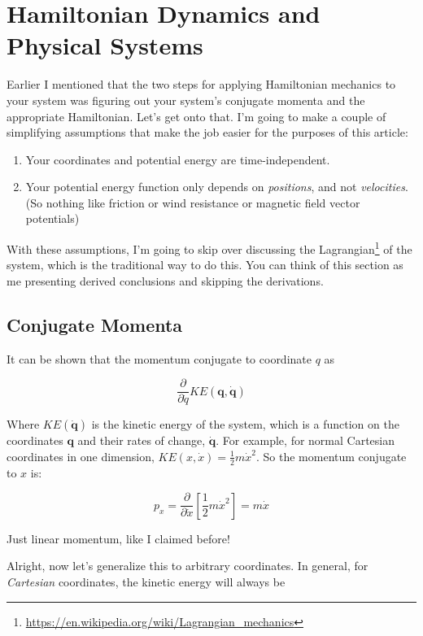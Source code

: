 \documentclass[]{article}
\renewcommand{\href}[2]{#2\footnote{\url{#1}}}
\begin{document}
\section{Hamiltonian Dynamics and Physical
Systems}\label{hamiltonian-dynamics-and-physical-systems}

Earlier I mentioned that the two steps for applying Hamiltonian mechanics to
your system was figuring out your system's conjugate momenta and the appropriate
Hamiltonian. Let's get onto that. I'm going to make a couple of simplifying
assumptions that make the job easier for the purposes of this article:

\begin{enumerate}
\def\labelenumi{\arabic{enumi}.}
\tightlist
\item
  Your coordinates and potential energy are time-independent.
\item
  Your potential energy function only depends on \emph{positions}, and not
  \emph{velocities}. (So nothing like friction or wind resistance or magnetic
  field vector potentials)
\end{enumerate}

With these assumptions, I'm going to skip over discussing the
\href{https://en.wikipedia.org/wiki/Lagrangian_mechanics}{Lagrangian} of the
system, which is the traditional way to do this. You can think of this section
as me presenting derived conclusions and skipping the derivations.

\subsection{Conjugate Momenta}\label{conjugate-momenta}

It can be shown that the momentum conjugate to coordinate \(q\) as

\[
\frac{\partial}{\partial \dot{q}} KE(\mathbf{q}, \dot{\mathbf{q}})
\]

Where \(KE(\dot{\mathbf{q}})\) is the kinetic energy of the system, which is a
function on the coordinates \(\mathbf{q}\) and their rates of change,
\(\dot{\mathbf{q}}\). For example, for normal Cartesian coordinates in one
dimension, \(KE(x, \dot{x}) = \frac{1}{2} m \dot{x}^2\). So the momentum
conjugate to \(x\) is:

\[
p_x = \frac{\partial}{\partial \dot{x}} \left[ \frac{1}{2} m \dot{x}^2 \right] = m \dot{x}
\]

Just linear momentum, like I claimed before!

Alright, now let's generalize this to arbitrary coordinates. In general, for
\emph{Cartesian} coordinates, the kinetic energy will always be
\end{document}
